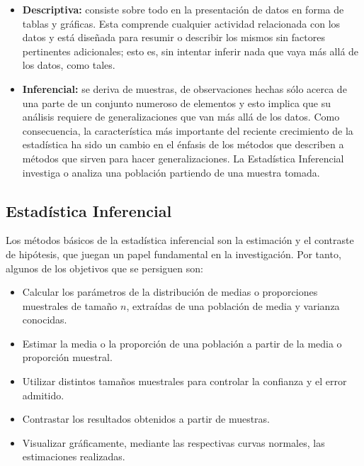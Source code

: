\documentclass[a4paper]{report} %
\begin{document}
\begin{itemize}
    \item \textbf{Descriptiva:} consiste sobre todo en la presentaci\'on de datos en forma de tablas y gr\'aficas. Esta comprende cualquier actividad relacionada con los datos y est\'a dise\~nada para resumir o describir los mismos sin factores pertinentes adicionales; esto es, sin intentar inferir nada que vaya m\'as all\'a de los datos, como tales.
    \item \textbf{Inferencial:} se deriva de muestras, de observaciones hechas s\'olo acerca de una parte de un conjunto numeroso de elementos y esto implica que su an\'alisis requiere de generalizaciones que van m\'as all\'a de los datos. Como consecuencia, la caracter\'istica m\'as importante del reciente crecimiento de la estad\'istica ha sido un cambio en el \'enfasis de los m\'etodos que describen a m\'etodos que sirven para hacer generalizaciones. La Estad\'istica Inferencial investiga o analiza una poblaci\'on partiendo de una muestra tomada.
\end{itemize}

\subsection*{Estad\'istica Inferencial}

Los m\'etodos b\'asicos de la estad\'istica inferencial son la estimaci\'on y el contraste de hip\'otesis, que juegan un papel fundamental en la investigaci\'on. Por tanto, algunos de los objetivos que se persiguen son:

\begin{itemize}
    \item Calcular los par\'ametros de la distribuci\'on de medias o proporciones muestrales de tama\~no $n$, extra\'idas de una poblaci\'on de media y varianza conocidas.
    \item Estimar la media o la proporci\'on de una poblaci\'on a partir de la media o proporci\'on muestral.
    \item Utilizar distintos tama\~nos muestrales para controlar la confianza y el error admitido.
    \item Contrastar los resultados obtenidos a partir de muestras.
    \item Visualizar gr\'aficamente, mediante las respectivas curvas normales, las estimaciones realizadas.
\end{itemize}
\end{document}
